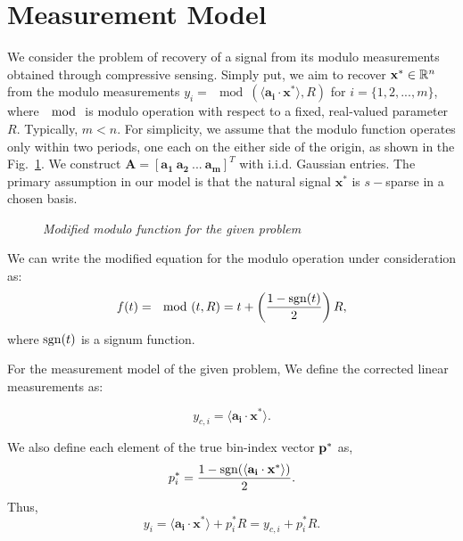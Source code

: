 \section{Measurement Model}
We consider the problem of recovery of a signal from its modulo measurements obtained through compressive sensing. Simply put, we aim to recover $\mathbf{x^*}\in {\mathbb{R}}^n$ from the modulo measurements $y_i=\mod(\langle \mathbf{a_i} \cdot \mathbf{x^*} \rangle,R)$ for $i = \{1,2,...,m\}$, where $\mod$ is modulo operation with respect to a fixed, real-valued parameter $R$. Typically, $m<n$. For simplicity, we assume that the modulo function operates only within two periods, one each on the either side of the origin, as shown in the Fig.~\ref{fig:graph}. We construct $\mathbf{A} = \left[\mathbf{a_1~a_2~...~a_m}\right]^T$ with i.i.d. Gaussian entries. The primary assumption in our model is that the natural signal $\mathbf{x^*}$ is $s-$sparse in a chosen basis. 

\begin{figure}[h]
	\begin{center}
\end{center}
\caption{\emph{Modified modulo function for the given problem}}
\label{fig:graph}
\end{figure}

We can write the modified equation for the modulo operation under consideration as:
$$
f(t) = \mod(t,R) = t+\left( \frac{1-\mathrm{sgn}(t)}{2}\right)R,
$$
where $\mathrm{sgn}(t)$ is a signum function.

For the measurement model of the given problem, 
We define the corrected linear measurements as: 

$$
y_{c,i} =\langle \mathbf{a_i} \cdot \mathbf{x^*} \rangle.
$$

We also define each element of the true bin-index vector $\mathbf{p^*}$ as,
$$
p^*_i = \frac{1-\mathrm{sgn}(\langle \mathbf{a_i} \cdot \mathbf{x^*} \rangle)}{2}.
$$
Thus,
$$
y_i = \langle \mathbf{a_i} \cdot \mathbf{x^*} \rangle + p^*_iR = y_{c,i}+p^*_iR.
$$

